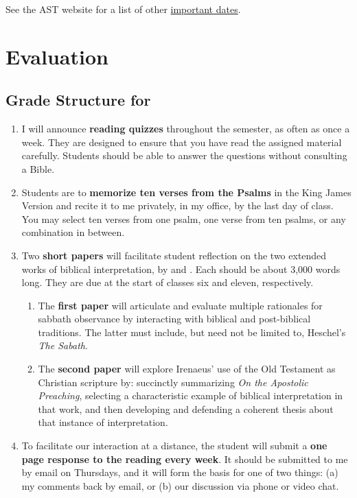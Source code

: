 \documentclass[titlepage]{article}
\begin{document}
See the AST website for a list of other \href{http://www.astheology.ns.ca/students/academic-dates.html}{important dates}.

\section{Evaluation}
\label{evaluation}

\subsection{Grade Structure for \ccode}
\label{structure}

\begin{enumerate}

	\item I will announce \textbf{reading quizzes} throughout the
	semester, as often as once a week. They are designed to ensure that
	you have read the assigned material carefully. Students should be
	able to answer the questions without consulting a Bible.

	\item Students are to \textbf{memorize ten verses from the Psalms}
	in the King James Version and recite it to me privately, in my
	office, by the last day of class. You may select ten verses from one
	psalm, one verse from ten psalms, or any combination in between.

	\item Two \textbf{short papers} will facilitate student reflection
	on the two extended works of biblical interpretation, by
	\cite{heschel} and \cite{irenaeus}. Each should be about 3,000 words
	long. They are due at the start of classes six and eleven,
	respectively.

	\begin{enumerate}

		\item The \textbf{first paper} will articulate and evaluate
		multiple rationales for sabbath observance by interacting with
		biblical and post-biblical traditions. The latter must include,
		but need not be limited to, Heschel's \emph{The Sabath}.

		\item The \textbf{second paper} will explore Irenaeus' use of
		the Old Testament as Christian scripture by: succinctly
		summarizing \emph{On the Apostolic Preaching}, selecting a
		characteristic example of biblical interpretation in that work,
		and then developing and defending a coherent thesis about that
		instance of interpretation.

	\end{enumerate}

	\item To facilitate our interaction at a distance, the student will
	submit a \textbf{one page response to the reading every week}. It
	should be submitted to me by email on Thursdays, and it will form
	the basis for one of two things: (a) my comments back by email, or
	(b) our discussion via phone or video chat.

\end{enumerate}
\end{document}
